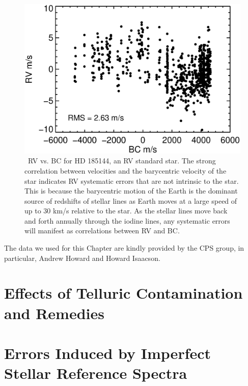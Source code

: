 \begin{figure}
\centering
\includegraphics[scale=0.32]{keck/185144_RV_BC.eps}
\caption{\keck\ RV vs. BC for HD 185144, an RV standard star. The
strong correlation between velocities and the barycentric velocity of
the star indicates RV systematic errors that are not intrinsic to the
star. This is because the barycentric motion of the Earth is the
dominant source of redshifts of stellar lines as Earth moves at a
large speed of up to 30 km/s relative to the star. As the stellar
lines move back and forth annually through the iodine lines, any
systematic errors will manifest as correlations between RV and BC.
\label{keck:fig:sigdra}}
\end{figure}

The data we used for this Chapter are kindly provided by the CPS
group, in particular, Andrew Howard and Howard Isaacson. 


\section{Effects of Telluric Contamination and
  Remedies}\label{keck:sec:telluric} 






\section{Errors Induced by Imperfect Stellar Reference Spectra}\label{keck:sec:dsst}

